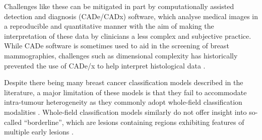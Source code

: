 Challenges like these can be mitigated in part by computationally assisted detection and diagnosis (CADe/CADx) software, which analyse medical images in a reproducible and quantitative manner with the aim of making the interpretation of these data by clinicians a less complex and subjective practice. While CADe software is sometimes used to aid in the screening of breast mammographies, challenges such as dimensional complexity has historically prevented the use of CADe/x to help interpret histological data \citep{rangayyan2007,madabhushi2009}.  \par

Despite there being many breast cancer classification models described in the literature, a major limitation of these models is that they fail to accommodate intra-tumour heterogeneity
as they commonly adopt whole-field classification modalities \citep{pareja2017,weigelt2010}. Whole-field classification models similarly do
not offer insight into so-called ``borderline'', which are lesions containing regions exhibiting features of multiple early lesions \citep{masood2011}.\par
